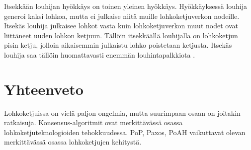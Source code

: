 \documentclass[utf8,bachelor]{gradu3}
\begin{document}
Itsekkään louhijan hyökkäys on toinen yleinen hyökkäys. Hyökkäyksessä louhija generoi kaksi lohkoa, mutta ei julkaise niitä muille lohkoketjuverkon nodeille. Itsekäs louhija julkaisee lohkot vasta kuin lohkoketjuverkon muut nodet ovat liittäneet uuden lohkon ketjuun. Tällöin itsekkäällä louhijalla on lohkoketjun pisin ketju, jolloin aikaisemmin julkaistu lohko poistetaan ketjusta. Itsekäs louhija saa tällöin huomattavasti enemmän louhintapalkkiota \parencite{zheng2017overview}. 




 \chapter{Yhteenveto}
 
 Lohkoketjuissa on vielä paljon ongelmia, mutta suurimpaan osaan on joitakin ratkaisuja.
 Konsensus-algoritmit ovat merkittävässä osassa lohkoketjuteknologioiden tehokkuudessa.
 PoP, Paxos, PoAH vaikuttavat olevan merkittävässä osassa lohkoketjujen kehitystä.
 
 
 


\printbibliography

\appendix
\end{document}
